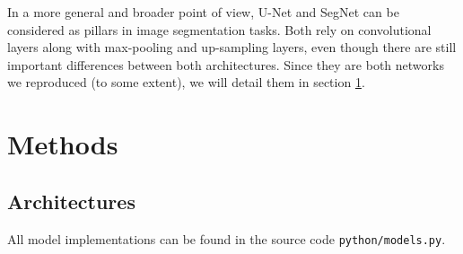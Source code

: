 \documentclass[twocolumn,superscriptaddress,aps,nofootinbib]{revtex4-1}
\begin{document}
In a more general and broader point of view, U-Net \cite{ronneberger2015u} and SegNet \cite{badrinarayanan2017segnet} can be considered as pillars in image segmentation tasks. Both rely on convolutional layers along with max-pooling and up-sampling layers, even though there are still important differences between both architectures. Since they are both networks we reproduced (to some extent), we will detail them in section \ref{sec:methods}.

\section{Methods} \label{sec:methods}

\subsection{Architectures}

All model implementations can be found in the source code \texttt{python/models.py}.
\end{document}
